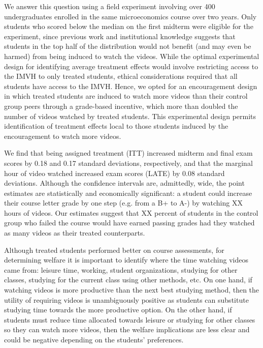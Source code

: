 \documentclass[12pt]{article}
\begin{document}
We answer this question using a field experiment involving over 400 undergraduates enrolled in the same microeconomics course over two years. Only students who scored below the median on the first midterm were eligible for the experiment, since previous work and institutional knowledge suggests that students in the top half of the distribution would not benefit (and may even be harmed) from being induced to watch the videos. While the optimal experimental design for identifying average treatment effects would involve restricting access to the IMVH to only treated students, ethical considerations required that all students have access to the IMVH. Hence, we opted for an encouragement design in which treated students are induced to watch more videos than their control group peers through a grade-based incentive, which more than doubled the number of videos watched by treated students. This experimental design permits identification of treatment effects local to those students induced by the encouragement to watch more videos.

We find that being assigned treatment (ITT) increased midterm and final exam scores by 0.18 and 0.17 standard deviations, respectively, and that the marginal hour of video watched increased exam scores (LATE) by 0.08 standard deviations. Although the confidence intervals are, admittedly, wide, the point estimates are statistically and economically significant: a student could increase their course letter grade by one step (e.g. from a B+ to A-) by watching XX hours of videos. Our estimates suggest that XX percent of students in the control group who failed the course would have earned passing grades had they watched as many videos as their treated counterparts.

Although treated students performed better on course assessments, for determining welfare it is important to identify where the time watching videos came from: leisure time, working, student organizations, studying for other classes, studying for the current class using other methods, etc. On one hand, if watching videos is more productive than the next best studying method, then the utility of requiring videos is unambiguously positive as students can substitute studying time towards the more productive option. On the other hand, if students must reduce time allocated towards leisure or studying for other classes so they can watch more videos, then the welfare implications are less clear and could be negative depending on the students' preferences.
\end{document}
